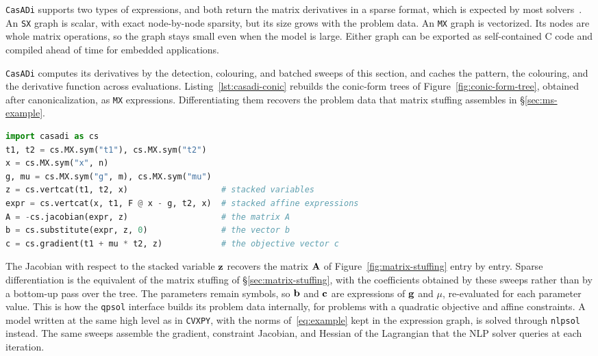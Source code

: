 \texttt{CasADi} supports two types of expressions, and both return the matrix derivatives in
a sparse format, which is expected by most solvers~\cite{casadidocs}. An
\texttt{SX} graph is scalar, with exact node-by-node sparsity, but its size grows with the
problem data. An \texttt{MX} graph is vectorized. Its nodes are whole
matrix operations, so the graph stays small even when the model is large. Either graph can
be exported as self-contained C code and compiled ahead of time for embedded applications.

\texttt{CasADi} computes its derivatives by the detection, colouring, and batched sweeps of
this section, and caches the pattern, the colouring, and the derivative function
across evaluations. Listing~\ref{lst:casadi-conic} rebuilds the conic-form trees of
Figure~\ref{fig:conic-form-tree}, obtained after canonicalization, as \texttt{MX}
expressions. Differentiating them recovers the problem data that matrix stuffing assembles
in \S\ref{sec:ms-example}.
\begin{lstlisting}[language=Python, caption={The conic form of the running example in
\texttt{CasADi}.}, label=lst:casadi-conic]
import casadi as cs
t1, t2 = cs.MX.sym("t1"), cs.MX.sym("t2")
x = cs.MX.sym("x", n)
g, mu = cs.MX.sym("g", m), cs.MX.sym("mu")
z = cs.vertcat(t1, t2, x)                   # stacked variables
expr = cs.vertcat(x, t1, F @ x - g, t2, x)  # stacked affine expressions
A = -cs.jacobian(expr, z)                   # the matrix A
b = cs.substitute(expr, z, 0)               # the vector b
c = cs.gradient(t1 + mu * t2, z)            # the objective vector c
\end{lstlisting}
The Jacobian with respect to the stacked variable $\mathbf{z}$ recovers the matrix $\mathbf{A}$
of Figure~\ref{fig:matrix-stuffing} entry by entry. Sparse differentiation is the equivalent of
the matrix stuffing of \S\ref{sec:matrix-stuffing}, with the coefficients obtained by these
sweeps rather than by a bottom-up pass over the tree. The parameters remain symbols, so
$\mathbf{b}$ and $\mathbf{c}$
are expressions of $\mathbf{g}$ and $\mu$, re-evaluated for each parameter value. This is how
the \texttt{qpsol} interface builds its problem data internally, for problems with a
quadratic objective and affine constraints. A model written at the same high level as in
\texttt{CVXPY}, with the norms of~\eqref{eq:example} kept in the expression graph, is solved
through \texttt{nlpsol} instead. The same sweeps assemble the gradient, constraint
Jacobian, and Hessian of the Lagrangian that the \ac{NLP} solver queries at each iteration.

